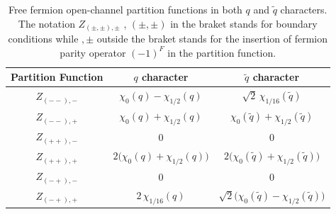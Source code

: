 %

\begin{table}[H]
\centering
\renewcommand{\arraystretch}{1.6}
\begin{tabular}{ccc}
\hline\hline
Partition Function & $ q $ character & $ \tilde{q} $ character \\ 
\hline\hline

$Z_{(--),-}$ 
& $\chi_0(q) - \chi_{1/2}(q)$
& $\sqrt{2}\,\chi_{1/16}(\tilde q)$
\\

$Z_{(--),+}$ 
& $\chi_0(q) + \chi_{1/2}(q)$
& $\chi_0(\tilde q) + \chi_{1/2}(\tilde q)$
\\

$Z_{(++),-}$ 
& 0
& 0
\\

$Z_{(++),+}$ 
& $2\big(\chi_0(q) + \chi_{1/2}(q)\big)$
& $2\big(\chi_0(\tilde{q}) + \chi_{1/2}(\tilde{q})\big)$
\\

$Z_{(-+),-}$ 
& 0
& 0
\\

$Z_{(-+),+}$ 
& $2\,\chi_{1/16}(q)$
& $\sqrt{2}\big(\chi_0(\tilde q) - \chi_{1/2}(\tilde q)\big)$
\\

\hline\hline
\end{tabular}
\caption{Free fermion open-channel partition functions in both $ q $ and $ \tilde{q} $ characters. The notation $ Z_{(\pm,\pm),\pm} $ , $ (\pm,\pm) $ in the braket stands for boundary conditions while $ , \pm $ outside the braket stands for the insertion of fermion parity operator $ (-1)^F $ in the partition function.}
\label{tab:open channel partition functions}
\end{table}



